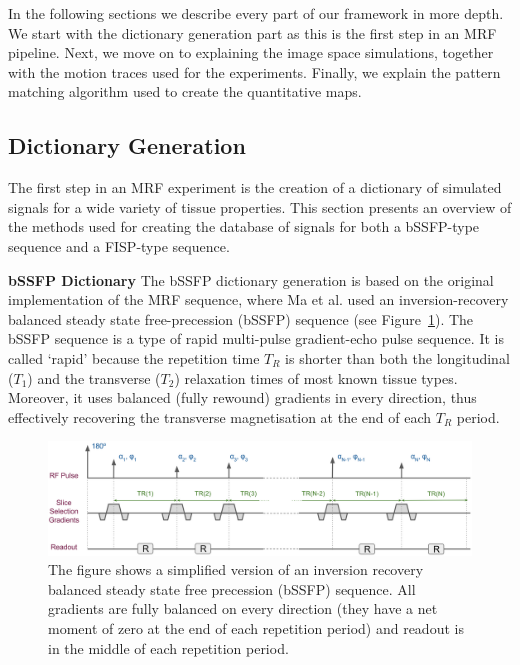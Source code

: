\hfill

In the following sections we describe every part of our framework in more depth.
We start with the dictionary generation part as this is the first step in an MRF pipeline.
Next, we move on to explaining the image space simulations, together with the motion traces used for the experiments.
Finally, we explain the pattern matching algorithm used to create the quantitative maps.

\hfill

\subsection{Dictionary Generation}
\label{method:dictionary}

The first step in an MRF experiment is the creation of a dictionary of simulated signals for a wide variety of tissue properties.
This section presents an overview of the methods used for creating the database of signals for both a bSSFP-type sequence and a FISP-type sequence.

\hfill

\large \textbf{bSSFP Dictionary} \normalsize
The bSSFP dictionary generation is based on the original implementation of the MRF sequence, where Ma et al. \cite{Ma2013} used an inversion-recovery balanced steady state free-precession (bSSFP) sequence (see Figure~\ref{fig:sequencebSSFP}). 
The bSSFP sequence is a type of rapid multi-pulse gradient-echo pulse sequence. 
It is called `rapid' because the repetition time $T_R$ is shorter than both the longitudinal ($T_1$) and the transverse ($T_2$) relaxation times of most known tissue types.
Moreover, it uses balanced (fully rewound) gradients in every direction, thus effectively recovering the transverse magnetisation at the end of each $T_R$ period.

\begin{figure}[ht]
    \centering
    \includegraphics[angle=0,width=1\textwidth, keepaspectratio]{images/mrf/sequencebSSFP}
    \caption{The figure shows a simplified version of an inversion recovery balanced steady state free precession (bSSFP) sequence. 
    All gradients are fully balanced on every direction (they have a net moment of zero at the end of each repetition period) and readout is in the middle of each repetition period.}
    \label{fig:sequencebSSFP}
\end{figure}

